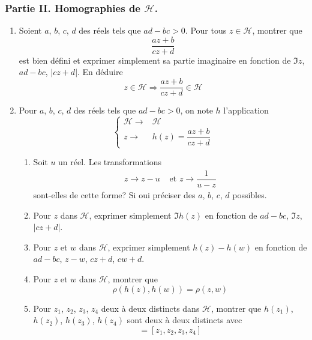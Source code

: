 \subsubsection*{Partie II. Homographies de $\mathcal H$.}
\begin{enumerate}
 \item Soient $a$, $b$, $c$, $d$ des réels tels que $ad-bc>0$. Pour tous $z\in \mathcal H$, montrer que 
\begin{displaymath}
 \dfrac{az+b}{cz+d}
\end{displaymath}
est bien défini et exprimer simplement sa partie imaginaire en fonction de $\Im z$, $ad-bc$, $|cz+d|$.\newline
En déduire
\begin{displaymath}
 z\in \mathcal H \Rightarrow \dfrac{az+b}{cz+d} \in \mathcal H
\end{displaymath}
\item Pour $a$, $b$, $c$, $d$ des réels tels que $ad-bc>0$, on note $h$ l'application
\begin{displaymath}
\left\lbrace 
 \begin{aligned}
  \mathcal H \rightarrow& \mathcal H \\
z \rightarrow& h(z)= \dfrac{az+b}{cz+d}
 \end{aligned}
\right. 
\end{displaymath}
\begin{enumerate}
 \item Soit $u$ un réel. Les transformations
\begin{align*}
 z\rightarrow z-u &\text{ et }  z \rightarrow \dfrac{1}{u-z}
\end{align*}
sont-elles de cette forme? Si oui préciser des $a$, $b$, $c$, $d$ possibles.
\item Pour $z$ dans $\mathcal H$, exprimer simplement $\Im h(z)$ en fonction de $ad-bc$, $\Im z$, $|cz+d|$.
\item Pour $z$ et $w$ dans $\mathcal H$, exprimer simplement $h(z)-h(w)$ en fonction de $ad-bc$, $z-w$, $cz+d$, $cw+d$.
\item Pour $z$ et $w$ dans $\mathcal H$, montrer que
\begin{displaymath}
 \rho(h(z),h(w))= \rho(z,w)
\end{displaymath}

\item Pour $z_1$, $z_2$, $z_3$, $z_4$ deux à deux distincts dans $\mathcal H$, montrer que $h(z_1)$, $h(z_2)$, $h(z_3)$, $h(z_4)$ sont deux à deux distincts avec
\begin{displaymath}
 [h(z_1),h(z_2),h(z_3),h(z_4)] = [z_1,z_2,z_3,z_4]
\end{displaymath}
\end{enumerate}

\end{enumerate}

